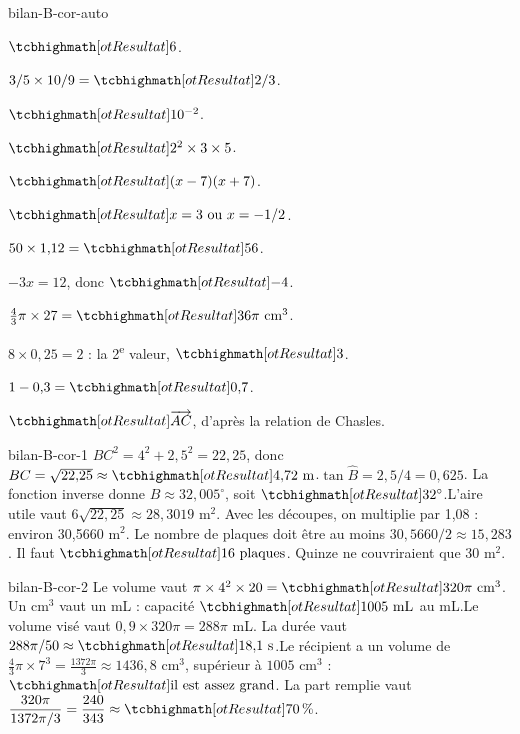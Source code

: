 \begin{blocEdition}{bilan-B-cor-auto}
\begin{questions}
\item $\res6$.
\item $3/5\times10/9=\res{2/3}$.
\item $\res{10^{-2}}$.
\item $\res{2^2\times3\times5}$.
\item $\res{(x-7)(x+7)}$.
\item $\res{x=3\text{ ou }x=-1/2}$.
\item $50\times1{,}12=\res{56}$.
\item $-3x=12$, donc $\res{-4}$.
\item $\frac43\pi\times27=\res{36\pi\text{ cm}^3}$.
\item $8\times0{,}25=2$ : la 2\textsuperscript{e} valeur, $\res3$.
\item $1-0{,}3=\res{0{,}7}$.
\item $\res{\vect{AC}}$, d’après la relation de Chasles.\end{questions}
\end{blocEdition}
\begin{blocEdition}{bilan-B-cor-1}
$BC^2=4^2+2{,}5^2=22{,}25$, donc $BC=\sqrt{22{,}25}\approx\res{4{,}72\text{ m}}$.$\tan\widehat B=2{,}5/4=0{,}625$. La fonction inverse donne $\widehat B\approx32{,}005^\circ$, soit $\res{32^\circ}$.L’aire utile vaut $6\sqrt{22{,}25}\approx28{,}3019$ m$^2$. Avec les découpes, on multiplie par 1,08 : environ 30,5660 m$^2$. Le nombre de plaques doit être au moins $30{,}5660/2\approx15{,}283$. Il faut $\res{16\text{ plaques}}$. Quinze ne couvriraient que 30 m$^2$.\label{fig-bilan-B-cor-1}

\end{blocEdition}
\begin{blocEdition}{bilan-B-cor-2}
Le volume vaut $\pi\times4^2\times20=\res{320\pi\text{ cm}^3}$. Un cm$^3$ vaut un mL : capacité $\res{1005\text{ mL}}$ au mL.Le volume visé vaut $0{,}9\times320\pi=288\pi$ mL. La durée vaut $288\pi/50\approx\res{18{,}1\text{ s}}$.Le récipient a un volume de $\frac43\pi\times7^3=\frac{1372\pi}3\approx1436{,}8$ cm$^3$, supérieur à $1005$ cm$^3$ : $\res{\text{il est assez grand}}$. La part remplie vaut $\dfrac{320\pi}{1372\pi/3}=\dfrac{240}{343}\approx\res{70\,\%}$.\label{fig-bilan-B-cor-2}

\end{blocEdition}

